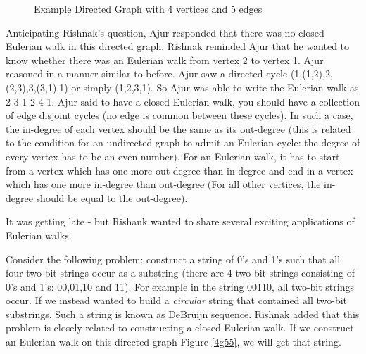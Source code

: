 \begin{figure}
\begin{center}
\caption{ Example Directed Graph with 4 vertices and 5 edges}\label{4g5}
\end{center}
\end{figure}


Anticipating Rishnak's question, Ajur responded that there was no closed Eulerian walk in this directed graph. Rishnak reminded Ajur that he wanted to know whether there was an Eulerian walk from vertex 2 to vertex 1. Ajur reasoned in a  manner similar to before. Ajur saw a directed cycle (1,(1,2),2,(2,3),3,(3,1),1) or simply (1,2,3,1). So Ajur was able to write the Eulerian walk as 2-3-1-2-4-1. Ajur said to have a closed Eulerian walk, you should have a collection of edge disjoint cycles (no edge is common between these cycles). In such a case, the in-degree of each vertex should be the same as its out-degree (this is related to the condition for an undirected graph to admit an Eulerian cycle: the degree of every vertex has to be an even number). For an Eulerian walk, it has to start from a vertex which has one more out-degree than in-degree and end in a vertex which has one more in-degree than out-degree (For all other vertices, the in-degree should be equal to the out-degree).

It was getting late - but Rishank wanted to share several exciting applications of Eulerian walks. 

Consider the following problem: construct a string of 0's and 1's such that all four two-bit strings occur as a substring (there are 4 two-bit strings consisting of 0's and 1's: 00,01,10 and 11). For example in the string 00110, all two-bit strings occur. If we instead wanted to build a \emph{circular} string that contained all two-bit substrings. Such a string is known as DeBruijn sequence. Rishnak added that this problem is closely related to constructing a closed Eulerian walk. If we construct an Eulerian walk on this directed graph Figure \ref{4g55}, we will get that string.

